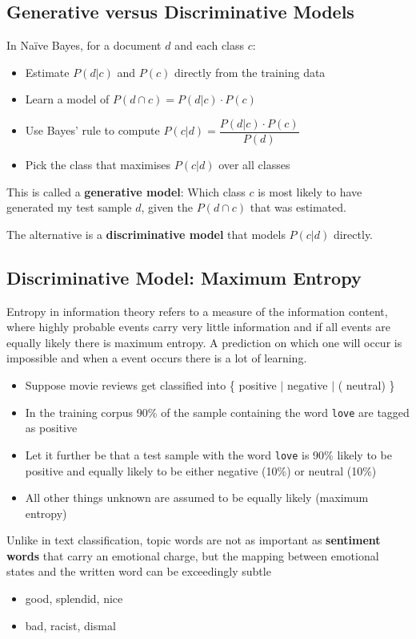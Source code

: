 \documentclass[11pt]{article}
\begin{document}
\subsection{Generative versus Discriminative Models}
In Naïve Bayes, for a document $d$ and each class $c$:
\begin{itemize}
	\item Estimate $P(d|c)$ and $P(c)$ directly from the training data
	\item Learn a model of $P(d\cap c) = P(d|c)\cdot P(c)$
	\item Use Bayes' rule to compute $P(c|d)=\dfrac{P(d|c)\cdot P(c)}{P(d)}$
	\item Pick the class that maximises $P(c|d)$ over all classes
\end{itemize}
This is called a \textbf{generative model}: Which class $c$ is most likely to have generated my test sample $d$, given the $P(d\cap c)$ that was estimated.

\noindent
The alternative is a \textbf{discriminative model} that models $P(c|d)$ directly.

\subsection{Discriminative Model: Maximum Entropy}
Entropy in information theory refers to a measure of the information content, where highly probable events carry very little information and if all events are equally likely there is maximum entropy. A prediction on which one will occur is impossible and when a event occurs there is a lot of learning.
\begin{itemize}
	\item Suppose movie reviews get classified into \{ {\color{green} positive} $\vert$ {\color{red} negative} $\vert$ ({\color{gray} neutral}) \}
	\item In the training corpus 90\% of the sample containing the word \texttt{love} are tagged as {\color{green} positive}
	\item Let it further be that a test sample with the word \texttt{love} is 90\% likely to be positive and equally likely to be either {\color{red} negative} (10\%) or {\color{gray} neutral} (10\%)
	\item All other things unknown are assumed to be equally likely (maximum entropy)
\end{itemize}
Unlike in text classification, topic words are not as important as \textbf{sentiment words} that carry an emotional charge, but the mapping between emotional states and the written word can be exceedingly subtle
\begin{itemize}[label=-]
	\item {\color{green} good}, {\color{green} splendid}, {\color{green} nice}
	\item {\color{red} bad}, {\color{red} racist}, {\color{red} dismal}
\end{itemize}
\end{document}
